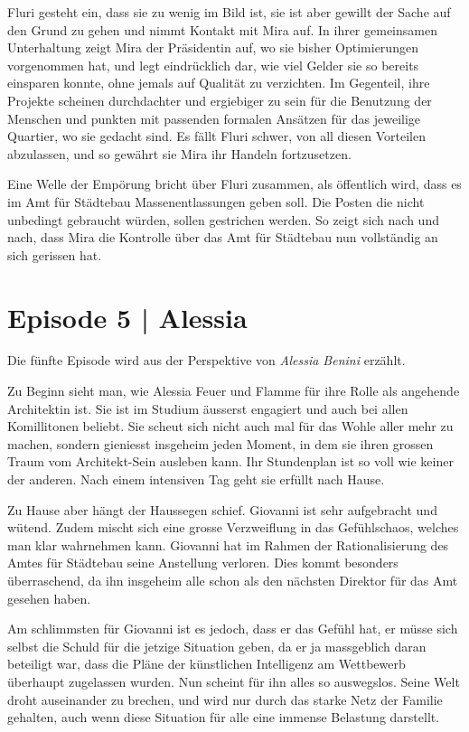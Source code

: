 \documentclass[11pt,a4paper,ngerman]{scrreprt}
\begin{document}
Fluri gesteht ein, dass sie zu wenig im Bild ist, sie ist aber gewillt der
Sache auf den Grund zu gehen und nimmt Kontakt mit Mira auf. In ihrer
gemeinsamen Unterhaltung zeigt Mira der Präsidentin auf, wo sie bisher
Optimierungen vorgenommen hat, und legt eindrücklich dar, wie viel Gelder sie so
bereits einsparen konnte, ohne jemals auf Qualität zu verzichten. Im Gegenteil,
ihre Projekte scheinen durchdachter und ergiebiger zu sein für die Benutzung der
Menschen und punkten mit passenden formalen Ansätzen für das jeweilige Quartier,
wo sie gedacht sind. Es fällt Fluri schwer, von all diesen Vorteilen
abzulassen, und so gewährt sie Mira ihr Handeln fortzusetzen.

Eine Welle der Empörung bricht über Fluri zusammen, als öffentlich wird, dass
es im Amt für Städtebau Massenentlassungen geben soll. Die Posten die nicht
unbedingt gebraucht würden, sollen gestrichen werden. So zeigt sich nach und
nach, dass Mira die Kontrolle über das Amt für Städtebau nun vollständig an sich
gerissen hat.

\section*{Episode 5 | Alessia}

Die fünfte Episode wird aus der Perspektive von \emph{Alessia Benini} erzählt.

Zu Beginn sieht man, wie Alessia Feuer und Flamme für ihre Rolle als angehende
Architektin ist. Sie ist im Studium äusserst engagiert und auch bei allen
Komillitonen beliebt. Sie scheut sich nicht auch mal für das Wohle aller mehr zu
machen, sondern gieniesst insgeheim jeden Moment, in dem sie ihren grossen Traum
vom Architekt-Sein ausleben kann. Ihr Stundenplan ist so voll wie keiner der
anderen. Nach einem intensiven Tag geht sie erfüllt nach Hause.

Zu Hause aber hängt der Haussegen schief. Giovanni ist sehr aufgebracht und
wütend. Zudem mischt sich eine grosse Verzweiflung in das Gefühlschaos, welches
man klar wahrnehmen kann. Giovanni hat im Rahmen der Rationalisierung des Amtes
für Städtebau seine Anstellung verloren. Dies kommt besonders überraschend, da
ihn insgeheim alle schon als den nächsten Direktor für das Amt gesehen haben.

Am schlimmsten für Giovanni ist es jedoch, dass er das Gefühl hat, er müsse sich
selbst die Schuld für die jetzige Situation geben, da er ja massgeblich daran
beteiligt war, dass die Pläne der künstlichen Intelligenz am Wettbewerb
überhaupt zugelassen wurden. Nun scheint für ihn alles so auswegslos. Seine Welt
droht auseinander zu brechen, und wird nur durch das starke Netz der Familie
gehalten, auch wenn diese Situation für alle eine immense Belastung darstellt.
\end{document}
